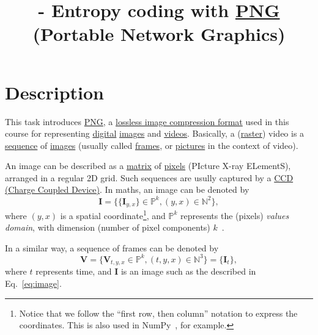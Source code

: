 


\title{\SM{} - Entropy coding with
  \href{https://vicente-gonzalez-ruiz.github.io/PNG/}{PNG} (Portable
  Network Graphics)}

\maketitle

\tableofcontents

\section{Description}

This task introduces
\href{https://vicente-gonzalez-ruiz.github.io/PNG/}{PNG}, a
\href{https://en.wikipedia.org/wiki/Lossless_compression}{lossless
  image compression format} used in this course for representing
\href{https://en.wikipedia.org/wiki/Digital_data}{digital}
\href{https://en.wikipedia.org/wiki/Digital_image}{images} and
\href{https://en.wikipedia.org/wiki/Video}{videos}. Basically, a
(\href{https://en.wikipedia.org/wiki/Raster_graphics}{raster}) video
is a \href{https://en.wikipedia.org/wiki/Sequence}{sequence} of
\href{https://en.wikipedia.org/wiki/Image}{images} (usually called
\href{https://en.wikipedia.org/wiki/Film_frame}{frames}, or
\href{https://en.wikipedia.org/wiki/Group_of_pictures}{pictures} in
the context of video).

An image can be described as a
\href{https://en.wikipedia.org/wiki/Matrix_(mathematics)}{matrix} of
\href{https://en.wikipedia.org/wiki/Pixel}{pixels} (PIcture X-ray
ELementS), arranged in a regular 2D grid. Such sequences are
usully captured by a
\href{https://en.wikipedia.org/wiki/Charge-coupled_device}{CCD (Charge
  Coupled Device)}. In maths, an image can be denoted by
\begin{equation}
  {\mathbf I} = \{\{{\mathbf I}_{y,x}\}\in\mathbb{P}^{k}, (y,x)\in\mathbb{N}^2\},
  \label{eq:image}
\end{equation}
where $(y,x)$ is a spatial coordinate\footnote{Notice that we follow
the ``first row, then column'' notation to express the
coordinates. This is also used in NumPy~\cite{harris2020array}, for
example.}, and $\mathbb{P}^{k}$ represents the (pixels) \emph{values
domain}, with dimension (number of pixel components)
$k$~\cite{burger2016digital}.

In a similar way, a sequence of frames can be denoted by
\begin{equation}
  {\mathbf V} = \{{\mathbf V}_{t,y,x}\in\mathbb{P}^{k}, (t,y,x)\in\mathbb{N}^3\} = \{{\mathbf I}_t\},
  \label{eq:video}
\end{equation}
where $t$ represents time, and ${\mathbf I}$ is an image such
as the described in Eq.~\eqref{eq:image}.

